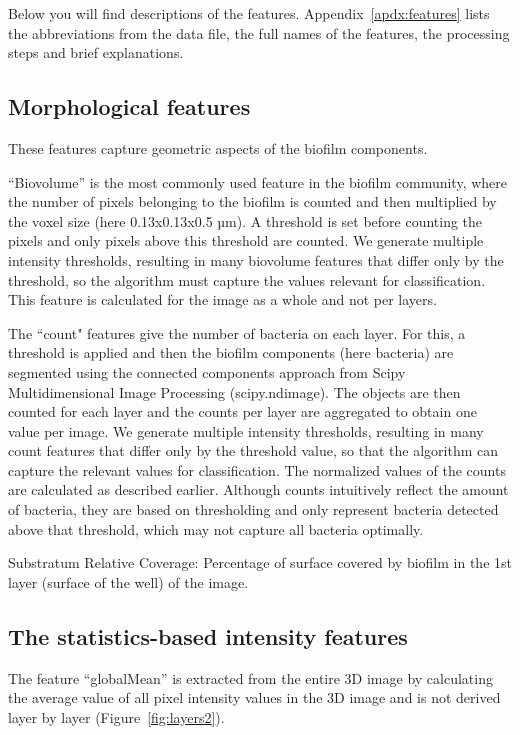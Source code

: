 \documentclass{ol-softwaremanual}
\begin{document}
Below you will find descriptions of the features. Appendix~\ref{apdx:features} lists the abbreviations from the data file, the full names of the features, the processing steps and brief explanations. 

\subsection{Morphological features}
These features capture geometric aspects of the biofilm components.

“Biovolume” is the most commonly used feature in the biofilm community, where the number of pixels belonging to the biofilm is counted and then multiplied by the voxel size (here 0.13x0.13x0.5 µm). A threshold is set before counting the pixels and only pixels above this threshold are counted. We generate multiple intensity thresholds, resulting in many biovolume features that differ only by the threshold, so the algorithm must capture the values relevant for classification. This feature is calculated for the image as a whole and not per layers.

The “count" features give the number of bacteria on each layer. For this, a threshold is applied and then the biofilm components (here bacteria) are segmented using the connected components approach from Scipy Multidimensional Image Processing (scipy.ndimage). The objects are then counted for each layer and the counts per layer are aggregated to obtain one value per image. We generate multiple intensity thresholds, resulting in many count features that differ only by the threshold value, so that the algorithm can capture the relevant values for classification. The normalized values of the counts are calculated as described earlier. Although counts intuitively reflect the amount of bacteria, they are based on thresholding and only represent bacteria detected above that threshold, which may not capture all bacteria optimally. 

Substratum Relative Coverage: Percentage of surface covered by biofilm in the 1st layer (surface of the well) of the image.


\subsection{The statistics-based intensity features}

The feature “globalMean” is extracted from the entire 3D image by calculating the average value of all pixel intensity values in the 3D image and is not derived layer by layer (Figure~\ref{fig:layers2}). 
\end{document}
